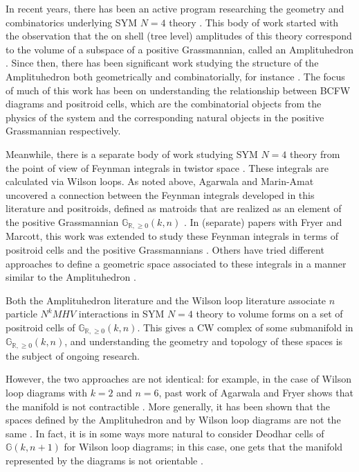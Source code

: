 \documentclass[11pt]{article}
\newcommand{\note}{\todo[color=green!40]}
\newcommand{\R}{\mathbb{R}}
\newcommand{\Gr}{\mathbb{G}_{\R, \geq 0}}
\theoremstyle{remark}
\theoremstyle{definition}
\begin{document}
In recent years, there has been an active program researching the geometry and combinatorics underlying SYM $N=4$ theory \cite{wilsonloop, Arkani-Hamed:2013jha, Amplituhedronsquared, galashinlam,AmplituhedronDecomposition}. This body of work started with the observation that the on shell (tree level) amplitudes of this theory correspond to the volume of a subspace of a positive Grassmannian, called an Amplituhedron \cite{Arkani-Hamed:2013jha}. Since then, there has been significant work studying the structure of the Amplituhedron both geometrically and combinatorially, for instance \cite{arkani:2012nw, Arkani-Hamed:2013kca, galashinlam,AmplituhedronDecomposition}. The focus of much of this work has been on understanding the relationship between BCFW diagrams and positroid cells, which are the combinatorial objects from the physics of the system and the corresponding natural objects in the positive Grassmannian respectively.

Meanwhile, there is a separate body of work studying SYM $N=4$ theory from the point of view of Feynman integrals in twistor space \cite{Adamo:2011pv, Britto:2005fq, Cachazo:2004kj}. These integrals are calculated via Wilson loops. As noted above, Agarwala and Marin-Amat uncovered a connection between the Feynman integrals developed in this literature and positroids, defined  as matroids that are realized as an element of the positive Grassmannian $\Gr(k,n)$ \cite{wilsonloop}. In (separate) papers with Fryer and Marcott, this work was extended to study these Feynman integrals in terms of positroid cells and the positive Grassmannians \cite{casestudy, non-orientable}. Others have tried different approaches to define a geometric space associated to these integrals in a manner similar to the Amplituhedron \cite{Amplituhedronsquared, HeslopStewart}. 

Both the Amplituhedron literature and the Wilson loop literature associate $n$ particle $N^kMHV$ interactions in SYM $N=4$ theory to volume forms on a set of positroid cells of $\Gr(k,n)$. This gives a CW complex of some submanifold in $\Gr(k,n)$, and understanding the geometry and topology of these spaces is the subject of ongoing research. 

However, the two approaches are not identical: for example, in the case of Wilson loop diagrams with $k=2$ and $n=6$, past work of Agarwala and Fryer shows that the manifold is not contractible \cite{casestudy}. More generally, it has been shown that the spaces defined by the Amplituhedron and by Wilson loop diagrams are not the same \cite{Amplituhedronsquared}. In fact, it is in some ways more natural to consider Deodhar cells of $\mathbb{G}(k, n+1)$ for Wilson loop diagrams; in this case, one gets that the manifold represented by the diagrams is not orientable \cite{non-orientable}. \note{Check with Cam.}
\end{document}
